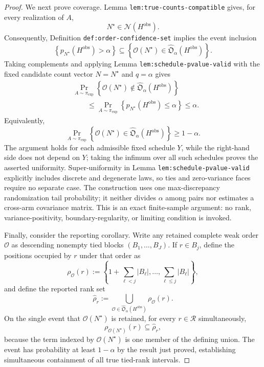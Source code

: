 \documentclass{article}
\begin{document}
\begin{proof}
We next prove coverage.  Lemma \texttt{lem:true-counts-compatible} gives, for every realization of \(A\),
\[
 N^\star\in\mathcal N(H^{\mathrm{obs}}).
\]
Consequently, Definition \texttt{def:order-confidence-set} implies the event inclusion
\[
 \left\{p_{N^\star}(H^{\mathrm{obs}})>\alpha\right\}
 \subseteq
 \left\{\mathcal O(N^\star)
 \in\widehat{\mathfrak O}_{\alpha}(H^{\mathrm{obs}})\right\}.
\]
Taking complements and applying Lemma \texttt{lem:schedule-pvalue-valid} with the fixed candidate count vector \(N=N^\star\) and \(q=\alpha\) gives
\[
\begin{aligned}
 &\Pr_{A\sim\pi_{\exp}}\!\left\{
   \mathcal O(N^\star)\notin
   \widehat{\mathfrak O}_{\alpha}(H^{\mathrm{obs}})
 \right\}\\
 &\qquad\leq
 \Pr_{A\sim\pi_{\exp}}\!\left\{
   p_{N^\star}(H^{\mathrm{obs}})\leq\alpha
 \right\}
 \leq\alpha.
\end{aligned}
\]
Equivalently,
\[
 \Pr_{A\sim\pi_{\exp}}\!\left\{
   \mathcal O(N^\star)\in
   \widehat{\mathfrak O}_{\alpha}(H^{\mathrm{obs}})
 \right\}\geq 1-\alpha.
\]
The argument holds for each admissible fixed schedule \(Y\), while the right-hand side does not depend on \(Y\); taking the infimum over all such schedules proves the asserted uniformity.  Super-uniformity in Lemma \texttt{lem:schedule-pvalue-valid} explicitly includes discrete and degenerate laws, so ties and zero-variance faces require no separate case.  The construction uses one max-discrepancy randomization tail probability; it neither divides \(\alpha\) among pairs nor estimates a cross-arm covariance matrix.  This is an exact finite-sample argument: no rank, variance-positivity, boundary-regularity, or limiting condition is invoked.

Finally, consider the reporting corollary.  Write any retained complete weak order \(\mathcal O\) as descending nonempty tied blocks \((B_1,\ldots,B_J)\).  If \(r\in B_j\), define the positions occupied by \(r\) under that order as
\[
 \rho_{\mathcal O}(r)
 :=\left\{
  1+\sum_{\ell<j}|B_\ell|,\ldots,
  \sum_{\ell\leq j}|B_\ell|
 \right\},
\]
and define the reported rank set
\[
 \widehat\rho_r
 :=\bigcup_{\mathcal O\in
   \widehat{\mathfrak O}_{\alpha}(H^{\mathrm{obs}})}
   \rho_{\mathcal O}(r).
\]
On the single event that \(\mathcal O(N^\star)\) is retained, for every \(r\in\mathcal R\) simultaneously,
\[
 \rho_{\mathcal O(N^\star)}(r)\subseteq\widehat\rho_r,
\]
because the term indexed by \(\mathcal O(N^\star)\) is one member of the defining union.  The event has probability at least \(1-\alpha\) by the result just proved, establishing simultaneous containment of all true tied-rank intervals.
\end{proof}
\end{document}
